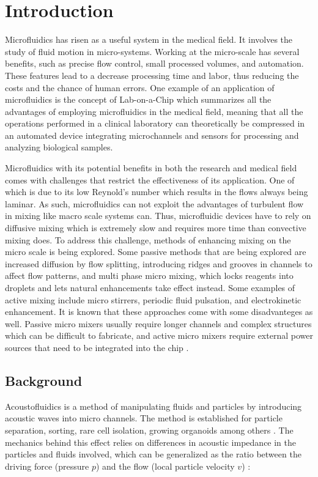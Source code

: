 \documentclass[twoside,twocolumn,9pt,a4paper]{IEEEtran}
\begin{document}
\section{Introduction} \label{secIntroduction}

Microfluidics has risen as a useful system in the medical field. It involves the study of fluid motion in micro-systems.\cite{Bruus} Working at the micro-scale has several benefits, such as precise flow control, small processed volumes, and automation. These features lead to a decrease processing time and labor, thus reducing the costs and the chance of human errors. One example of an application of microfluidics is the concept of Lab-on-a-Chip which summarizes all the advantages of employing microfluidics in the medical field, meaning that all the operations performed in a clinical laboratory can theoretically be compressed in an automated device integrating microchannels and sensors for processing and analyzing biological samples.

Microfluidics with its potential benefits in both the research and medical field comes with challenges that restrict the effectiveness of its application. One of which is due to its low Reynold’s number which results in the flows always being laminar. As such, microfluidics can not exploit the advantages of turbulent flow in mixing like macro scale systems can. Thus, microfluidic devices have to rely on diffusive mixing which is extremely slow and requires more time than convective mixing does. To address this challenge, methods of enhancing mixing on the micro scale is being explored. Some passive methods that are being explored are increased diffusion by flow splitting, introducing ridges and grooves in channels to affect flow patterns, and multi phase micro mixing, which locks reagents into droplets and lets natural enhancements take effect instead. Some examples of active mixing include micro stirrers, periodic fluid pulsation, and electrokinetic enhancement. It is known that these approaches come with some disadvanteges as well. Passive micro mixers usually require longer channels and complex structures which can be difficult to fabricate, and active micro mixers require external power sources that need to be integrated into the chip \cite{Ward}.

\subsection{Background}

Acoustofluidics is a method of manipulating fluids and particles by introducing acoustic waves into micro channels. The method is established for particle separation, sorting, rare cell isolation, growing organoids among others \cite{Deshmukh} \cite{Sharda}.  The mechanics behind this effect relies on differences in acoustic impedance in the particles and fluids involved, which can be generalized as the ratio between the driving force (pressure \(p\)) and the flow (local particle velocity \(v\)) \cite{Corato}:
\end{document}

